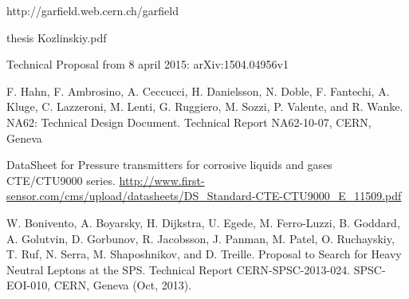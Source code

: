 \documentclass[12pt,a4paper]{article}
\begin{document}
\newpage
\begin{thebibliography}{00}
	 http://garfield.web.cern.ch/garfield

	 thesis Kozlinskiy.pdf 
	
	 Technical Proposal from 8 april 2015: arXiv:1504.04956v1	
	
	 F. Hahn, F. Ambrosino, A. Ceccucci, H. Danielsson, N. Doble, F. Fantechi, A. Kluge, C. Lazzeroni, M. Lenti, G. Ruggiero, M. Sozzi, P. Valente, and R. Wanke. NA62: Technical Design Document. Technical Report NA62-10-07, CERN, Geneva
	
	 DataSheet for Pressure transmitters for corrosive liquids and gases CTE/CTU9000 series. \url{http://www.first-sensor.com/cms/upload/datasheets/DS_Standard-CTE-CTU9000_E_11509.pdf}
	
	 W. Bonivento, A. Boyarsky, H. Dijkstra, U. Egede, M. Ferro-Luzzi, B. Goddard, A. Golutvin, D. Gorbunov, R. Jacobsson, J. Panman, M. Patel, O. Ruchayskiy, T. Ruf, N. Serra, M. Shaposhnikov, and D. Treille. Proposal to Search for Heavy Neutral Leptons at the SPS. Technical Report CERN-SPSC-2013-024. SPSC-EOI-010, CERN, Geneva (Oct, 2013).
	
\end{thebibliography}
	
\end{document}
